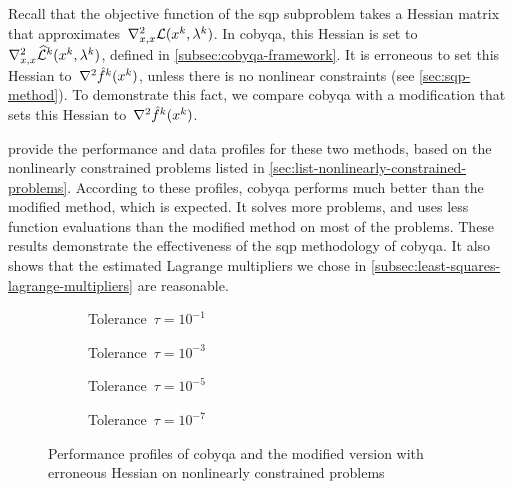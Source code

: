 Recall that the objective function of the \gls{sqp} subproblem takes a Hessian matrix that approximates~$\nabla_{x, x}^2 \lag(\iter[k], \lm[k])$.
In \gls{cobyqa}, this Hessian is set to~$\nabla_{x, x}^2 \lagm[k](\iter[k], \lm[k])$, defined in \cref{subsec:cobyqa-framework}.
It is erroneous to set this Hessian to~$\nabla^2 \objm[k](\iter[k])$, unless there is no nonlinear constraints (see \cref{sec:sqp-method}).
To demonstrate this fact, we compare \gls{cobyqa} with a modification that sets this Hessian to~$\nabla^2 \objm[k](\iter[k])$.

 provide the performance and data profiles for these two methods, based on the nonlinearly constrained problems listed in \cref{sec:list-nonlinearly-constrained-problems}.
According to these profiles, \gls{cobyqa} performs much better than the modified method, which is expected.
It solves more problems, and uses less function evaluations than the modified method on most of the problems.
These results demonstrate the effectiveness of the \gls{sqp} methodology of \gls{cobyqa}.
It also shows that the estimated Lagrange multipliers we chose in \cref{subsec:least-squares-lagrange-multipliers} are reasonable.

\begin{figure}[ht]
    \centering
    \begin{subfigure}[b]{0.49\textwidth}
        \centering
        \caption{Tolerance~$\tau = 10^{-1}$}
    \end{subfigure}
    \hfill
    \begin{subfigure}[b]{0.49\textwidth}
        \centering
        \caption{Tolerance~$\tau = 10^{-3}$}
    \end{subfigure}
    \begin{subfigure}[b]{0.49\textwidth}
        \centering
        \caption{Tolerance~$\tau = 10^{-5}$}
    \end{subfigure}
    \hfill
    \begin{subfigure}[b]{0.49\textwidth}
        \centering
        \caption{Tolerance~$\tau = 10^{-7}$}
    \end{subfigure}
    \caption[Performance profiles with erroneous Hessian]{Performance profiles of \gls{cobyqa} and the modified version with erroneous Hessian on nonlinearly constrained problems}
    \label{fig:perf-wrong-hessian}
\end{figure}

